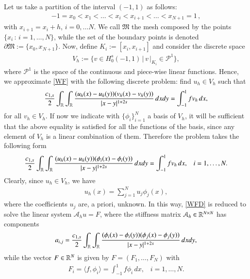 Let us take a partition of the interval $(-1,1)$ as follows:
\begin{align*}
	-1 = x_0<x_1<\ldots <x_i<x_{i+1}<\ldots<x_{N+1}=1\,,
\end{align*}
with $x_{i+1}=x_i+h$, $i=0,\ldots N$. We call $\mathfrak{M}$ the mesh composed by the points $\{x_i\,:\, i=1,\ldots,N\}$, while the set of the boundary points is denoted $\partial\mathfrak{M}:=\{x_0,x_{N+1}\}$. Now, define $K_i:=[x_i,x_{i+1}]$ and consider the discrete space 
\begin{align}\label{Vh}
	V_h :=\Big\{v\in H_0^s(-1,1)\,\big|\, \left. v\,\right|_{K_i}\in \mathcal{P}^1\Big\},
\end{align} 
where $\mathcal{P}^1$ is the space of the continuous and piece-wise linear functions. Hence, we approximate \eqref{WF} with the following discrete problem: find $u_h\in V_h$ such that
\begin{align*}
	\frac{c_{1,s}}{2} \int_{\mathbb{R}}\int_{\mathbb{R}}\frac{(u_h(x)-u_h(y))(v_h(x)-v_h(y))}{|x-y|^{1+2s}}\,dxdy = \int_{-1}^1 fv_h\,dx,	
\end{align*}
for all $v_h\in V_h$. If now we indicate with $\big\{\phi_i\big\}_{i=1}^N$ a basis of $V_h$, it will be sufficient that the above equality is satisfied for all the functions of the basis, since any element of $V_h$ is a linear combination of them. Therefore the problem takes the following form
\begin{align}\label{WFD}
	\frac{c_{1,s}}{2} \int_{\mathbb{R}}\int_{\mathbb{R}}\frac{(u_h(x)-u_h(y))(\phi_i(x)-\phi_i(y))}{|x-y|^{1+2s}}\,dxdy = \int_{-1}^1 fv_h\,dx,\;\;\; i=1,\ldots,N.	
\end{align}
Clearly, since $u_h\in V_h$, we have 
\begin{align*}
	u_h(x) = \sum_{j=1}^N u_j\phi_j(x),
\end{align*} 
where the coefficients $u_j$ are, a priori, unknown. In this way, \eqref{WFD} is reduced to solve the linear system $\mathcal A_h u=F$, where the stiffness matrix $\mathcal A_h\in \mathbb{R}^{N\times N}$ has components
\begin{align}\label{stiffness_nc}
	a_{i,j}=\frac{c_{1,s}}{2} \int_{\mathbb{R}}\int_{\mathbb{R}}\frac{(\phi_i(x)-\phi_i(y))(\phi_j(x)-\phi_j(y))}{|x-y|^{1+2s}}\,dxdy,	
\end{align}
while the vector $F\in\mathbb{R}^N$ is given by $F=(F_1,\ldots,F_N)$ with
\begin{align*}
	F_i = \langle f,\phi_i\rangle = \int_{-1}^1 f\phi_i\,dx,\;\;\; i=1,\ldots,N.
\end{align*}


